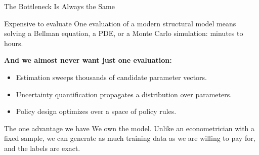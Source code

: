 \documentclass[aspectratio=169,11pt]{beamer}
\newcommand{\emphc}[1]{\textcolor{harvardcrimson}{#1}}
\begin{document}
\begin{frame}{The Bottleneck Is Always the Same}
\begin{block}{Expensive to evaluate}
One evaluation of a modern structural model means solving a Bellman equation, a PDE, or a Monte Carlo simulation: minutes to hours.
\end{block}

\vspace{0.25cm}
\textbf{And we almost never want just one evaluation:}
\begin{itemize}\itemsep2pt
  \item \emphc{Estimation} sweeps thousands of candidate parameter vectors.
  \item \emphc{Uncertainty quantification} propagates a distribution over parameters.
  \item \emphc{Policy design} optimizes over a space of policy rules.
\end{itemize}

\vspace{0.25cm}
\begin{alertblock}{The one advantage we have}
\emphc{We own the model.} Unlike an econometrician with a fixed sample, we can generate as much training data as we are willing to pay for, and the labels are exact.
\end{alertblock}
\end{frame}
\end{document}
